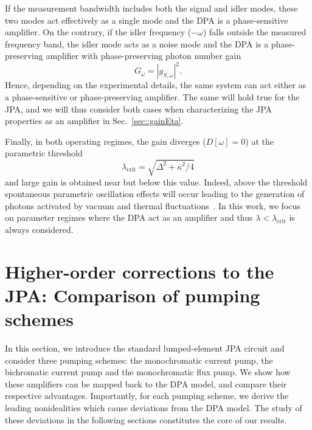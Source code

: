 \documentclass[pra,twocolumn,superscriptaddress]{revtex4-1}
\newcommand{\lcrit}[0]{\lambda_{\mathrm{crit}}}
\newcommand{\kappaTot}[0]{\overline{\kappa}}
\newcommand{\abs}[1]{\left|#1\right|}
\begin{document}
If the measurement bandwidth includes both the signal and idler modes, these two modes act effectively as a single mode and the DPA is a phase-sensitive amplifier.
On the contrary, if the idler frequency ($-\omega$) falls outside the measured frequency band, the idler mode acts as a noise mode and the DPA is a phase-preserving amplifier with phase-preserving photon number gain~\cite{caves:1982a,Eichler:2013kx}
\begin{equation}
	G_\omega = \abs{g_{S,\omega}}^2.
	\label{eq:phasePreservingGain}
\end{equation}
Hence, depending on the experimental details, the same system can act either as a phase-sensitive or phase-preserving amplifier. The same will hold true for the JPA, and we will thus consider both cases when characterizing the JPA properties as an amplifier in Sec.~\ref{sec::gainEta}.

Finally, in both operating regimes, the gain diverges ($D[\omega]=0$) at the parametric threshold~\cite{Laflamme:2011vn,Wustmann:2013uq}
\begin{equation}
	\lcrit  = \sqrt{\Delta^2 + \kappaTot^{2}/4}
	\label{eq:paramThresh}
\end{equation}
and large gain is obtained near but below this value.
Indeed, above the threshold spontaneous parametric oscillation effects will occur leading to the  generation of photons activated by vacuum and thermal fluctuations~\cite{Wilson:2010vn,Wustmann:2013uq}. In this work, we focus on parameter regimes where the DPA act as an amplifier and thus $\lambda < \lcrit$ is always considered.


\section{Higher-order corrections to the JPA: Comparison of pumping schemes}
\label{sec::LJPApumps}
In this section, we introduce the standard lumped-element JPA circuit
and consider three pumping schemes: the monochromatic current pump, the bichromatic current pump  and the monochromatic flux pump. We show how these amplifiers can be mapped back to the DPA model, and compare their respective advantages. Importantly, for each pumping scheme, we derive the leading nonidealities which cause deviations from the DPA model. The study of these deviations in the following sections constitutes the core of our results.
\end{document}
